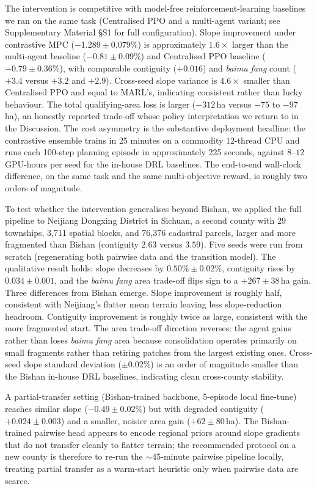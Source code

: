 \documentclass[11pt]{article}
\begin{document}
The intervention is competitive with model-free reinforcement-learning baselines we ran on the same task (Centralised PPO and a multi-agent variant; see Supplementary Material \S S1 for full configuration). Slope improvement under contrastive MPC ($-1.289 \pm 0.079\%$) is approximately $1.6\times$ larger than the multi-agent baseline ($-0.81 \pm 0.09\%$) and Centralised PPO baseline ($-0.79 \pm 0.36\%$), with comparable contiguity ($+0.016$) and \textit{baimu fang} count ($+3.4$ versus $+3.2$ and $+2.9$). Cross-seed slope variance is $4.6\times$ smaller than Centralised PPO and equal to MARL's, indicating consistent rather than lucky behaviour. The total qualifying-area loss is larger ($-312$\,ha versus $-75$ to $-97$\,ha), an honestly reported trade-off whose policy interpretation we return to in the Discussion. The cost asymmetry is the substantive deployment headline: the contrastive ensemble trains in 25 minutes on a commodity 12-thread CPU and runs each 100-step planning episode in approximately 225 seconds, against $8$--$12$ GPU-hours per seed for the in-house DRL baselines. The end-to-end wall-clock difference, on the same task and the same multi-objective reward, is roughly two orders of magnitude.

To test whether the intervention generalises beyond Bishan, we applied the full pipeline to Neijiang Dongxing District in Sichuan, a second county with 29 townships, 3{,}711 spatial blocks, and 76{,}376 cadastral parcels, larger and more fragmented than Bishan (contiguity $2.63$ versus $3.59$). Five seeds were run from scratch (regenerating both pairwise data and the transition model). The qualitative result holds: slope decreases by $0.50\% \pm 0.02\%$, contiguity rises by $0.034 \pm 0.001$, and the \textit{baimu fang} area trade-off flips sign to a $+267 \pm 38$\,ha gain. Three differences from Bishan emerge. Slope improvement is roughly half, consistent with Neijiang's flatter mean terrain leaving less slope-reduction headroom. Contiguity improvement is roughly twice as large, consistent with the more fragmented start. The area trade-off direction reverses: the agent gains rather than loses \textit{baimu fang} area because consolidation operates primarily on small fragments rather than retiring patches from the largest existing ones. Cross-seed slope standard deviation ($\pm 0.02\%$) is an order of magnitude smaller than the Bishan in-house DRL baselines, indicating clean cross-county stability.

A partial-transfer setting (Bishan-trained backbone, 5-episode local fine-tune) reaches similar slope ($-0.49 \pm 0.02\%$) but with degraded contiguity ($+0.024 \pm 0.003$) and a smaller, noisier area gain ($+62 \pm 80$\,ha). The Bishan-trained pairwise head appears to encode regional priors around slope gradients that do not transfer cleanly to flatter terrain; the recommended protocol on a new county is therefore to re-run the $\sim$45-minute pairwise pipeline locally, treating partial transfer as a warm-start heuristic only when pairwise data are scarce.
\end{document}
